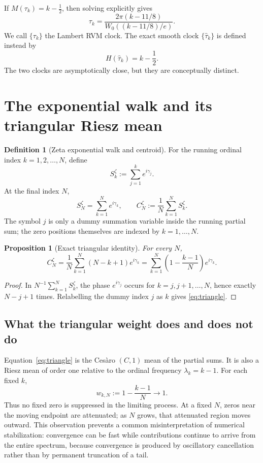 \documentclass[11pt]{amsart}
\numberwithin{equation}{section}
\newtheorem{proposition}[theorem]{Proposition}
\theoremstyle{definition}
\newtheorem{definition}[theorem]{Definition}
\theoremstyle{remark}
\begin{document}
If $M(\tau_k)=k-\tfrac12$, then solving explicitly gives
\begin{equation}\label{eq:Lambertinverse}
\boxed{
\tau_k=\frac{2\pi(k-11/8)}{W_0((k-11/8)/e)}.
}
\end{equation}
We call $\{\tau_k\}$ the Lambert RVM clock. The exact smooth clock $\{\widehat\tau_k\}$ is defined instead by
\[
H(\widehat\tau_k)=k-\frac12.
\]
The two clocks are asymptotically close, but they are conceptually distinct.

\section{The exponential walk and its triangular Riesz mean}\label{sec:riesz}

\begin{definition}[Zeta exponential walk and centroid]
For the running ordinal index \(k=1,2,\ldots,N\), define
\[
S_k^{\zeta}:=\sum_{j=1}^{k}e^{i\gamma_j}.
\]
At the final index \(N\),
\[
S_N^{\zeta}=\sum_{k=1}^{N}e^{i\gamma_k},\qquad
C_N^{\zeta}:=\frac1N\sum_{k=1}^{N}S_k^{\zeta}.
\]
The symbol \(j\) is only a dummy summation variable inside the running partial sum; the zero positions themselves are indexed by \(k=1,\ldots,N\).
\end{definition}

\begin{proposition}[Exact triangular identity]\label{prop:triangle}
For every $N$,
\begin{equation}\label{eq:triangle}
\boxed{
C_N^{\zeta}
=\frac1N\sum_{k=1}^N(N-k+1)e^{i\gamma_k}
=\sum_{k=1}^N\left(1-\frac{k-1}{N}\right)e^{i\gamma_k}.
}
\end{equation}
\end{proposition}
\begin{proof}
In \(N^{-1}\sum_{k=1}^{N}S_k^{\zeta}\), the phase \(e^{i\gamma_j}\) occurs for \(k=j,j+1,\ldots,N\), hence exactly \(N-j+1\) times. Relabelling the dummy index \(j\) as \(k\) gives \eqref{eq:triangle}.
\end{proof}

\subsection{What the triangular weight does and does not do}
Equation~\eqref{eq:triangle} is the Cesàro $(C,1)$ mean of the partial sums. It is also a Riesz mean of order one relative to the ordinal frequency $\lambda_k=k-1$. For each fixed $k$,
\[
w_{k,N}:=1-\frac{k-1}{N}\longrightarrow1.
\]
Thus no fixed zero is suppressed in the limiting process. At a fixed $N$, zeros near the moving endpoint are attenuated; as $N$ grows, that attenuated region moves outward. This observation prevents a common misinterpretation of numerical stabilization: convergence can be fast while contributions continue to arrive from the entire spectrum, because convergence is produced by oscillatory cancellation rather than by permanent truncation of a tail.
\end{document}

